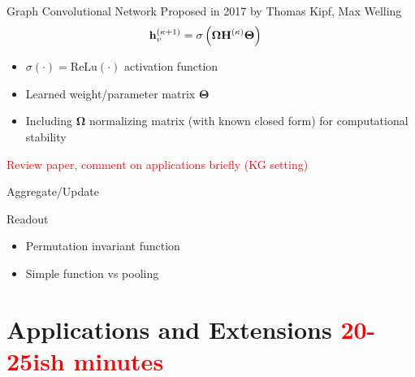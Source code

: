 \documentclass{beamer}
\newcommand{\node}{v}
\newcommand{\edge}{e}
\newcommand{\iter}{\kappa}
\begin{document}
\begin{frame}{Graph Convolutional Network}
Proposed in 2017 by Thomas Kipf, Max Welling \cite{kipf_semi-supervised_2017}
    \begin{align*}
    \iffalse
        \mathbf{h}_\node^{(\iter+1)} 
        &=
        \text{Update}
        \left( 
        x_\node^{(\iter)}
        ,   
        \text{Aggregate}
        (
            h_\node^{(\iter)}, x_u^{(\iter)}, \edge_{u,\node}^{(\iter)}
        )
        \right)
    \\
    \fi 
        \mathbf{h}_\node^{(\iter+1)} 
        &=
        \sigma
        \left( 
            \mathbf{
            \Omega 
            H^{(\iter)}
            \Theta 
            }            
        \right)
\end{align*}

\begin{itemize}
    \item $\sigma(\cdot) = \text{ReLu}(\cdot)$ activation function
    \item Learned weight/parameter matrix $\boldsymbol\Theta$
    \item Including $\boldsymbol\Omega$ normalizing matrix (with known closed form) for computational stability 
\end{itemize}
\textcolor{red}{Review paper, comment on applications briefly (KG setting)}
\end{frame}

\begin{frame}{Aggregate/Update}
\end{frame}

\begin{frame}{Readout}
    \begin{itemize}
        \color{red}
        \item Permutation invariant function 
        \item Simple function vs pooling
    \end{itemize}
\end{frame}

\section{Applications and Extensions \textcolor{red}{20-25ish minutes}}
\end{document}
